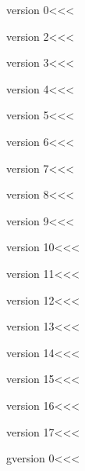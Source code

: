 




\<version 0\><<<

\<version 2\><<<

\<version 3\><<<


\<version 4\><<<


\<version 5\><<<


\<version 6\><<<


\<version 7\><<<


\<version 8\><<<


\<version 9\><<<


\<version 10\><<<


\<version 11\><<<


\<version 12\><<<


\<version 13\><<<


\<version 14\><<<


\<version 15\><<<


\<version 16\><<<



\<version 17\><<<



\<gversion 0\><<<



